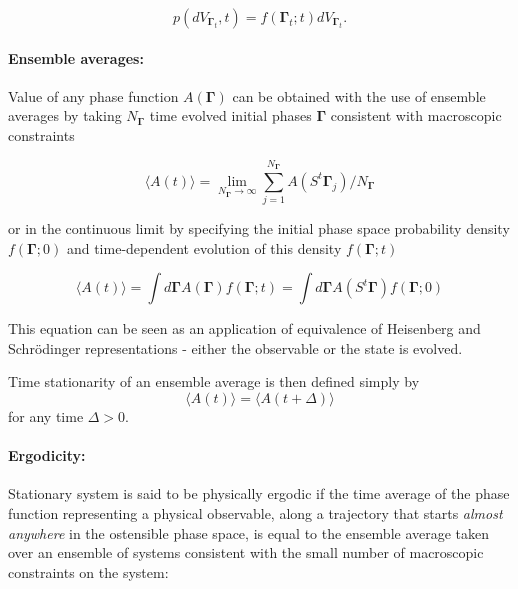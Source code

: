 \documentclass[a4paper,12pt]{article}
\begin{document}
\begin{equation}
  p(d V_{\bm{\Gamma}_t},t) = f(\bm{\Gamma}_t;t)d V_{\bm{\Gamma}_t}.
\end{equation}


\paragraph{Ensemble averages:}

Value of any phase function $A(\bm{\Gamma})$ can be obtained with the use of ensemble averages by taking $N_{\bm{\Gamma}} $ time evolved initial phases $\bm{\Gamma}$ consistent with macroscopic constraints

\begin{equation}
  \langle A(t) \rangle = \lim_{N_{\bm{\Gamma}}
 \to \infty} \sum_{j=1}^{N_{\bm{\Gamma}}} A(S^t \bm{\Gamma}_j)/N_{\bm{\Gamma}}
\end{equation}

or in the continuous limit by specifying the initial phase space probability density $f(\bm{\Gamma};0)$ and time-dependent evolution of this density $f(\bm{\Gamma};t)$

\begin{equation}
  \langle A(t) \rangle = \int d\bm{\Gamma} A(\bm{\Gamma}) f(\bm{\Gamma};t) = \int d\bm{\Gamma} A(S^t\bm{\Gamma})f(\bm{\Gamma};0)
\end{equation}

This equation can be seen as an application of equivalence of Heisenberg and Schrödinger representations - either the observable or the state is evolved.

Time stationarity of an ensemble average is then defined simply by
\begin{equation}
\label{StationaryStateDef}
    \langle A(t) \rangle =   \langle A(t+\Delta) \rangle
\end{equation}
for any time $\Delta > 0$.


\paragraph{Ergodicity:}
Stationary system is said to be physically ergodic if the time average of the phase function representing a physical observable, along a trajectory that starts \textit{almost anywhere}\cite{Evans:2241458} in the ostensible phase space, is equal to the ensemble average taken over an ensemble of systems consistent with the small number of macroscopic constraints on the system:
\end{document}
